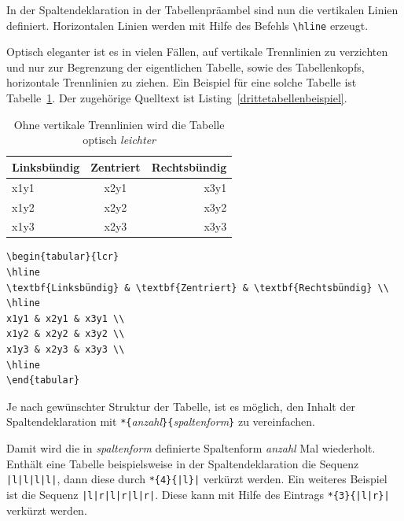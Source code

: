 \documentclass[a4paper,10pt,twoside]{scrbook}
\begin{document}
In der Spaltendeklaration in der Tabellenpräambel sind nun die vertikalen Linien definiert.
Horizontalen Linien werden mit Hilfe des Befehls \verb!\hline! erzeugt.

Optisch eleganter ist es in vielen Fällen, auf vertikale Trennlinien zu verzichten und
nur zur Begrenzung der eigentlichen Tabelle, sowie des Tabellenkopfs, horizontale Trennlinien zu ziehen. 
Ein Beispiel für eine solche Tabelle ist Tabelle~\ref{Tabelle_Spaltenformatierungseintrag3}. Der zugehörige Quelltext ist Listing~\ref{drittetabellenbeispiel}. 



\begin{table}[h!tb]
\centering
\caption{Ohne vertikale Trennlinien wird die Tabelle optisch \emph{leichter}}
\label{Tabelle_Spaltenformatierungseintrag3}
\begin{tabular}{lcr}
\hline
\textbf{Linksbündig} & \textbf{Zentriert} & \textbf{Rechtsbündig} \\
\hline
x1y1 & x2y1 & x3y1 \\
x1y2 & x2y2 & x3y2 \\
x1y3 & x2y3 & x3y3 \\
\hline
\end{tabular}
\end{table}



\begin{lstlisting}[caption={Ohne vertikale und mit weniger horizontalen Linien wirkt die Tabelle eleganter},label=drittetabellenbeispiel, style=customlatex]
\begin{tabular}{lcr}
\hline
\textbf{Linksbündig} & \textbf{Zentriert} & \textbf{Rechtsbündig} \\
\hline
x1y1 & x2y1 & x3y1 \\
x1y2 & x2y2 & x3y2 \\
x1y3 & x2y3 & x3y3 \\
\hline
\end{tabular}
\end{lstlisting}

Je nach gewünschter Struktur der Tabelle, ist es möglich, den Inhalt der Spaltendeklaration mit 
\verb!*{!\textsl{anzahl}\verb!}{!\textsl{spaltenform}\verb!}! zu vereinfachen.

Damit wird die in \textsl{spaltenform} definierte
Spaltenform \textsl{anzahl} Mal wiederholt. Enthält eine Tabelle beispielsweise in der Spaltendeklaration die Sequenz \verb!|l|l|l|l|!, dann diese durch \verb!*{4}{|l}|! verkürzt werden. Ein weiteres Beispiel ist die Sequenz \verb!|l|r|l|r|l|r|!. Diese kann mit Hilfe des Eintrags \verb!*{3}{|l|r}|! verkürzt werden.
\end{document}

